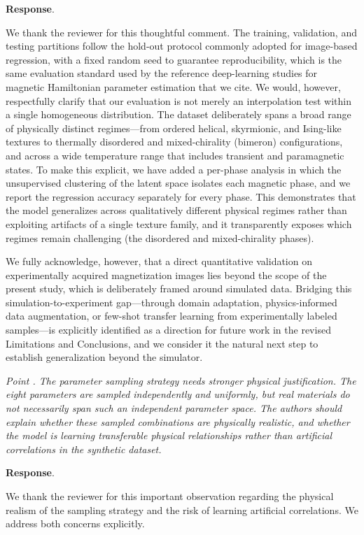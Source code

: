 \documentclass[review,12pt]{report}
\newenvironment{reviewer}{\setcounter{pointcounter}{1}}{}
\newcommand{\point}[1]{\medskip \noindent
 \textsl{{\fontseries{b}\selectfont Point \thepointcounter}.
 \stepcounter{pointcounter} #1}}
\newcommand{\reply}{\medskip \noindent \textbf{Response}.\ }
\begin{document}
\begin{reviewer}
\reply{We thank the reviewer for this thoughtful comment. The training, validation, and testing partitions follow the hold-out protocol commonly adopted for image-based regression, with a fixed random seed to guarantee reproducibility, which is the same evaluation standard used by the reference deep-learning studies for magnetic Hamiltonian parameter estimation that we cite. We would, however, respectfully clarify that our evaluation is not merely an interpolation test within a single homogeneous distribution. The dataset deliberately spans a broad range of physically distinct regimes---from ordered helical, skyrmionic, and Ising-like textures to thermally disordered and mixed-chirality (bimeron) configurations, and across a wide temperature range that includes transient and paramagnetic states. To make this explicit, we have added a per-phase analysis in which the unsupervised clustering of the latent space isolates each magnetic phase, and we report the regression accuracy separately for every phase. This demonstrates that the model generalizes across qualitatively different physical regimes rather than exploiting artifacts of a single texture family, and it transparently exposes which regimes remain challenging (the disordered and mixed-chirality phases).

We fully acknowledge, however, that a direct quantitative validation on experimentally acquired magnetization images lies beyond the scope of the present study, which is deliberately framed around simulated data. Bridging this simulation-to-experiment gap---through domain adaptation, physics-informed data augmentation, or few-shot transfer learning from experimentally labeled samples---is explicitly identified as a direction for future work in the revised Limitations and Conclusions, and we consider it the natural next step to establish generalization beyond the simulator.}



\point{The parameter sampling strategy needs stronger physical justification. The eight parameters are sampled independently and uniformly, but real materials do not necessarily span such an independent parameter space. The authors should explain whether these sampled combinations are physically realistic, and whether the model is learning transferable physical relationships rather than artificial correlations in the synthetic dataset.}

\reply{We thank the reviewer for this important observation regarding the physical realism of the sampling strategy and the risk of learning artificial correlations. We address both concerns explicitly.

}
\end{reviewer}
\end{document}
